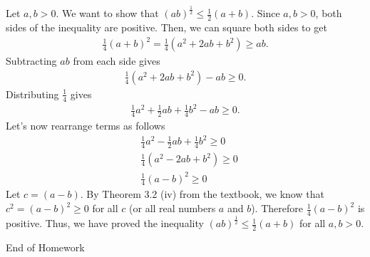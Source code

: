 \documentclass [10pt]{article}
\newcommand{\jg}[1]{{\color{blue} #1}}
\begin{document}
\jg{
Let $a, b > 0$. We want to show that $(ab)^{\frac{1}{2}} \leq \frac{1}{2}(a+b)$. Since $a,b > 0$, both sides of the inequality are positive. Then, we can square both sides to get
\begin{align*}
    \frac{1}{4}(a+b)^2 = \frac{1}{4}(a^2 + 2ab + b^2) \geq ab.
\end{align*}
Subtracting $ab$ from each side gives 
\begin{align*}
    \frac{1}{4}(a^2 + 2ab + b^2) - ab \geq 0. 
\end{align*}
Distributing $\frac{1}{4}$ gives 
\begin{align*}
    \frac{1}{4}a^2 + \frac{1}{2}ab + \frac{1}{4}b^2 - ab \geq 0.
\end{align*}
Let's now rearrange terms as follows 
\begin{align*}
   &\frac{1}{4}a^2 - \frac{1}{2}ab + \frac{1}{4}b^2 \geq 0\\
   &\frac{1}{4}(a^2 - 2ab + b^2) \geq 0 \\
   &\frac{1}{4}(a-b)^2 \geq 0
\end{align*}
Let $c = (a-b)$. By Theorem 3.2 (iv) from the textbook, we know that $c^2 = (a-b)^2 \geq 0$ for all $c$ (or all real numbers $a$ and $b$). Therefore $\frac{1}{4}(a-b)^2$ is positive. Thus, we have proved the inequality $(ab)^{\frac{1}{2}} \leq \frac{1}{2}(a+b)$ for all $a, b > 0$. 
}

\clearpage
\begin{center}
\vspace*{\fill}
{\Large End of Homework}
\vspace*{\fill}
\end{center}
\end{document}
